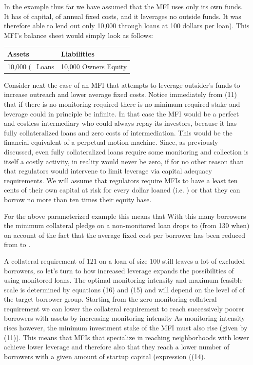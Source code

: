 \documentclass{article}
\begin{document}
In the example thus far we have assumed that the MFI uses only its own
funds. It has of capital, of annual fixed costs, and it leverages no
outside funds. It was therefore able to lend out only 10,000 through
loans at 100 dollars per loan). This MFI's balance sheet would simply
look as follows:

\begin{longtable}[c]{@{}ll@{}}
\toprule
\textbf{Assets} & \textbf{Liabilities}\tabularnewline
\midrule
\endhead
10,000 (=Loans & 10,000 Owners Equity\tabularnewline
\bottomrule
\end{longtable}

Consider next the case of an MFI that attempts to leverage outsider's
funds to increase outreach and lower average fixed costs. Notice
immediately from (11) that if there is no monitoring required there is
no minimum required stake and leverage could in principle be infinite.
In that case the MFI would be a perfect and costless intermediary who
could always repay its investors, because it has fully collateralized
loans and zero costs of intermediation. This would be the financial
equivalent of a perpetual motion machine. Since, as previously
discussed, even fully collateralized loans require some monitoring and
collection is itself a costly activity, in reality would never be zero,
if for no other reason than that regulators would intervene to limit
leverage via capital adequacy requirements. We will assume that
regulators require MFIs to have a least ten cents of their own capital
at risk for every dollar loaned (i.e. ) or that they can borrow no more
than ten times their equity base.

For the above parameterized example this means that With this many
borrowers the minimum collateral pledge on a non-monitored loan drops to
(from 130 when) on account of the fact that the average fixed cost per
borrower has been reduced from to .

A collateral requirement of 121 on a loan of size 100 still leaves a lot
of excluded borrowers, so let's turn to how increased leverage expands
the possibilities of using monitored loans. The optimal monitoring
intensity and maximum feasible scale is determined by equations (16) and
(15) and will depend on the level of of the target borrower group.
Starting from the zero-monitoring collateral requirement we can lower
the collateral requirement to reach successively poorer borrowers with
assets by increasing monitoring intensity As monitoring intensity rises
however, the minimum investment stake of the MFI must also rise (given
by (11)). This means that MFIs that specialize in reaching neighborhoods
with lower achieve lower leverage and therefore also that they reach a
lower number of borrowers with a given amount of startup capital
(expression ((14).
\end{document}
